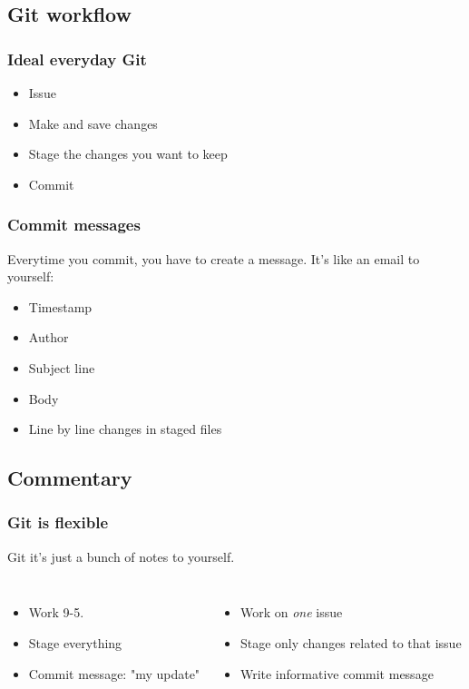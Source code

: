 \documentclass{beamer}
\begin{document}
\subsection{Git workflow}

\begin{frame}
    \frametitle{Ideal everyday Git}
    \begin{itemize}
        \item Issue
        \item Make and save changes
        \item Stage the changes you want to keep
        \item Commit
    \end{itemize}
\end{frame}

\begin{frame}
    \frametitle{Commit messages}
    Everytime you commit, you have to create a message. It's like an email to yourself:
    \begin{itemize}
        \item Timestamp
        \item Author
        \item Subject line
        \item Body
        \item Line by line changes in staged files
    \end{itemize}
\end{frame}

\subsection{Commentary}

\begin{frame}
    \frametitle{Git is flexible}
    Git it's just a bunch of notes to yourself.
    \begin{columns}
        \begin{itemize}
            \item Work 9-5. 
            \item Stage everything
            \item Commit message: "my update"
        \end{itemize}
        \begin{itemize}
            \item Work on \textit{one} issue
            \item Stage only changes related to that issue
            \item Write informative commit message
        \end{itemize}
    \end{columns}
\end{frame}
\end{document}
